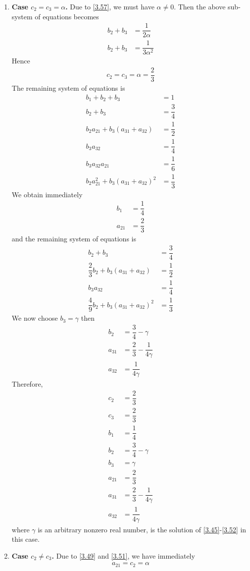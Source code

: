 \documentclass[a4paper,oneside]{book}
\numberwithin{equation}{chapter}
\begin{document}
\begin{enumerate}
\item \textbf{Case $c_2=c_3=\alpha$.} Due to \eqref{3.57}, we must have $\alpha \ne 0$. Then the above sub-system of equations becomes
\begin{align}
{b_2} + {b_3} &= \dfrac{1}{{2\alpha }}\\
{b_2} + {b_3} &= \dfrac{1}{{3{\alpha ^2}}}
\end{align}
Hence
\begin{align}
c_2=c_3 =\alpha =\dfrac{2}{3}
\end{align}
The remaining system of equations is
\begin{align}
{b_1} + {b_2} + {b_3} &= 1\\
{b_2} + {b_3} &= \dfrac{3}{4}\\
{b_2}{a_{21}} + {b_3}\left( {{a_{31}} + {a_{32}}} \right) &= \dfrac{1}{2}\\
{b_3}{a_{32}} &= \dfrac{1}{4}\\
{b_3}{a_{32}}{a_{21}} &= \dfrac{1}{6}\\
{b_2}a_{21}^2 + {b_3}{\left( {{a_{31}} + {a_{32}}} \right)^2} &= \dfrac{1}{3}
\end{align}
We obtain immediately
\begin{align}
{b_1} &= \dfrac{1}{4}\\
{a_{21}} &= \dfrac{2}{3}
\end{align}
and the remaining system of equations is
\begin{align}
{b_2} + {b_3} &= \dfrac{3}{4}\label{3.141}\\
\dfrac{2}{3}{b_2} + {b_3}\left( {{a_{31}} + {a_{32}}} \right) &= \dfrac{1}{2}\label{3.142}\\
{b_3}{a_{32}} &= \dfrac{1}{4}\\
\dfrac{4}{9}{b_2} + {b_3}{\left( {{a_{31}} + {a_{32}}} \right)^2} &= \dfrac{1}{3}\label{3.144}
\end{align}
We now choose $b_3=\gamma$ then
\begin{align}
{b_2} &= \dfrac{3}{4} - \gamma \\
{a_{31}} &= \dfrac{2}{3} - \dfrac{1}{{4\gamma }}\\
{a_{32}} &= \dfrac{1}{{4\gamma }}
\end{align}
Therefore,
\begin{align}
{c_2} &= \dfrac{2}{3}\\
{c_3} &= \dfrac{2}{3}\\
{b_1} &= \dfrac{1}{4}\\
{b_2} &= \dfrac{3}{4} - \gamma \\
{b_3} &= \gamma \\
{a_{21}} &= \dfrac{2}{3}\\
{a_{31}} &= \dfrac{2}{3} - \dfrac{1}{{4\gamma }}\\
{a_{32}} &= \dfrac{1}{{4\gamma }}
\end{align}
where $\gamma$ is an arbitrary  nonzero real number, is the solution of \eqref{3.45}-\eqref{3.52} in this case.
\item \textbf{Case $c_2 \ne c_3$.} Due to \eqref{3.49} and \eqref{3.51}, we have immediately
\begin{align}
a_{21}=c_2=\alpha
\end{align}


\end{enumerate}
\end{document}
